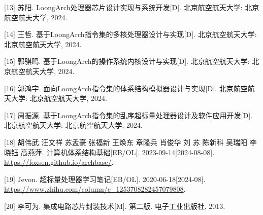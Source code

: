 {[}13{]} 苏阳. LoongArch处理器芯片设计实现与系统开发{[}D{]}. 北京航空航天大学: 北京航空航天大学, 2024.

{[}14{]} 王哲. 基于LoongArch指令集的多核处理器设计与实现{[}D{]}. 北京航空航天大学: 北京航空航天大学, 2024.

{[}15{]} 郭骐鸣. 基于LoongArch的操作系统内核设计与实现{[}D{]}. 北京航空航天大学: 北京航空航天大学, 2024.

{[}16{]} 郭鸿宇. 面向LoongArch指令集的体系结构模拟器设计与实现{[}D{]}. 北京航空航天大学: 北京航空航天大学, 2024.

{[}17{]} 周振源. 基于LoongArch指令集的乱序超标量处理器设计及软件应用开发{[}D{]}. 北京航空航天大学: 北京航空航天大学, 2024.

{[}18{]} 胡伟武 汪文祥 苏孟豪 张福新 王焕东 章隆兵 肖俊华 刘 苏 陈新科 吴瑞阳 李晓钰 高燕萍. 计算机体系结构基础{[}EB/OL{]}. 2023-09-14{[}2024-08-08{]}. \url{https://foxsen.github.io/archbase/}.

{[}19{]} Jevon. 超标量处理器学习笔记{[}EB/OL{]}. 2020-06-18{[}2024-08{]}. \url{https://www.zhihu.com/column/c_1253708282457079808}.

{[}20{]} 李可为. 集成电路芯片封装技术{[}M{]}. 第二版. 电子工业出版社, 2013.
